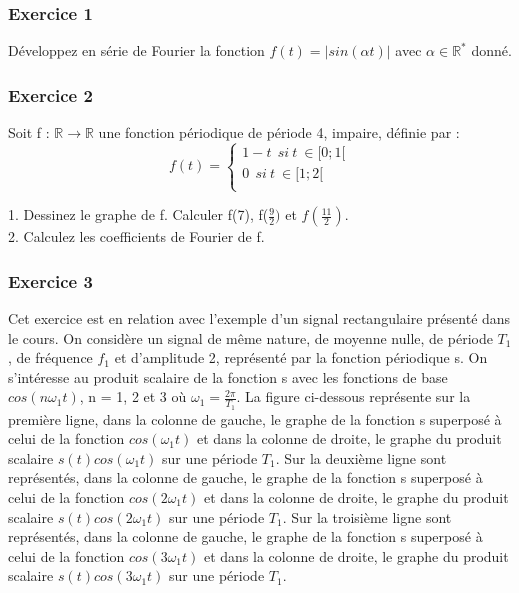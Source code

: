 \subsubsection{Exercice 1}
	Développez en série de Fourier la fonction $f(t)=|sin(\alpha t)|$ avec $\alpha \in \mathbb{R^{*}}$ donné.\\
	
	\subsubsection{Exercice 2}
	Soit f : $\mathbb{R} \rightarrow \mathbb{R}$ une fonction périodique de période 4, impaire, définie par :
	\begin{equation*}
	f(t)=\left \{
	\begin{array}{l}
	1-t~~si~t~\in[0;1[ \\
	0~~si~t~\in[1;2[ \\
	\end{array}
	\right .
	\end{equation*}
	
	1. Dessinez le graphe de f. Calculer f(7), f($\frac{9}{2})$ et $f(\frac{11}{2})$.\\
	
	2. Calculez les coefficients de Fourier de f.\\
	
	\subsubsection{Exercice 3}
	Cet exercice est en relation avec l'exemple d'un signal rectangulaire présenté dans le cours. On considère un signal de même nature, de moyenne nulle, de période $T_1$, de fréquence $f_1$ et	d'amplitude 2, représenté par la fonction périodique s. On s'intéresse au produit scalaire de la fonction s avec les fonctions de base $cos(n\omega_{1}t)$, n = 1, 2 et 3 où $\omega_{1} = \frac{2\pi}{T_1}$. La figure ci-dessous représente sur la première ligne, dans la colonne de gauche, le graphe de la fonction s superposé à celui de	la fonction $cos(\omega_{1}t)$ et dans la colonne de droite, le graphe du produit scalaire $s(t)cos(\omega_{1}t)$ sur
	une période $T_1$. Sur la deuxième ligne sont représentés, dans la colonne de gauche, le graphe de la fonction s superposé à celui de la fonction $cos(2\omega_{1}t)$ et dans la colonne de droite, le graphe	du produit scalaire $s(t)cos(2\omega_{1}t)$ sur une période $T_1$. Sur la troisième ligne sont représentés,
	dans la colonne de gauche, le graphe de la fonction s superposé à celui de la fonction  $cos(3\omega_{1}t)$	et dans la colonne de droite, le graphe du produit scalaire $s(t)cos(3\omega_{1}t)$ sur une période $T_1$. 
	
